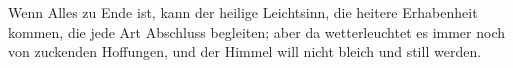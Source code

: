 Wenn Alles zu Ende ist, kann der heilige Leichtsinn, die heitere Erhabenheit kommen, die jede Art Abschluss begleiten; aber da wetterleuchtet es immer noch von zuckenden Hoffungen, und der Himmel will nicht bleich und still werden.
\par

